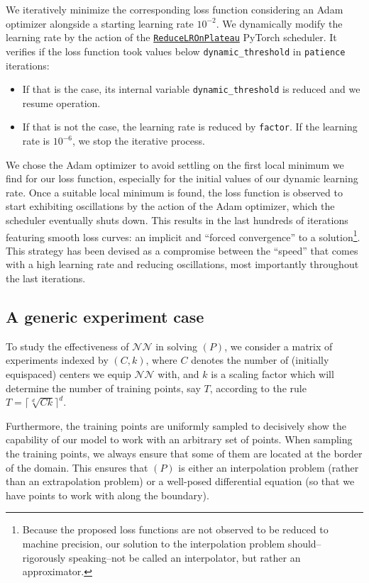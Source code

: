 \documentclass[12pt]{report} %
\begin{document}
We iteratively minimize the corresponding loss function considering an Adam optimizer alongside a starting learning rate $10^{-2}$. We dynamically modify the learning rate by the action of the \href{https://pytorch.org/docs/stable/generated/torch.optim.lr_scheduler.ReduceLROnPlateau.html}{\texttt{ReduceLROnPlateau}} PyTorch scheduler. It verifies if the loss function took values below \texttt{dynamic\_threshold} in \texttt{patience} iterations:
\begin{itemize}
  \item If that is the case, its internal variable \texttt{dynamic\_threshold} is reduced and we resume operation.
  \item If that is not the case, the learning rate is reduced by \texttt{factor}. If the learning rate is $10^{-6}$, we stop the iterative process.
\end{itemize}

We chose the Adam optimizer to avoid settling on the first local minimum we find for our loss function, especially for the initial values of our dynamic learning rate. Once a suitable local minimum is found, the loss function is observed to start exhibiting oscillations by the action of the Adam optimizer, which the scheduler eventually shuts down. This results in the last hundreds of iterations featuring smooth loss curves: an implicit and ``forced convergence'' to a solution\footnote{Because the proposed loss functions are not observed to be reduced to machine precision, our solution to the interpolation problem should--rigorously speaking--not be called an interpolator, but rather an approximator.}. This strategy has been devised as a compromise between the ``speed'' that comes with a high learning rate and reducing oscillations, most importantly throughout the last iterations.

\subsection{A generic experiment case}

To study the effectiveness of $\mathcal{NN}$ in solving $(P)$, we consider a matrix of experiments indexed by $(C,k)$, where $C$ denotes the number of (initially equispaced) centers we equip $\mathcal{NN}$ with, and $k$ is a scaling factor which will determine the number of training points, say $T$, according to the rule
$T = \lceil \sqrt[d]{C  k} \rceil ^d $.

Furthermore, the training points are uniformly sampled to decisively show the capability of our model to work with an arbitrary set of points. When sampling the training points, we always ensure that some of them are located at the border of the domain. This ensures that $(P)$ is either an interpolation problem (rather than an extrapolation problem) or a well-posed differential equation (so that we have points to work with along the boundary).
\end{document}
